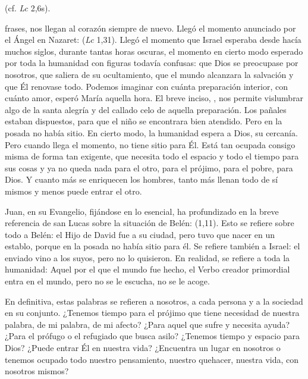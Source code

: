 
\begin{body}	
	 (cf. \emph{Lc} 2,6s). 
	
	 frases, nos llegan al corazón siempre de nuevo. Llegó el momento anunciado por el Ángel en Nazaret:  (\emph{Lc} 1,31). Llegó el momento que Israel esperaba desde hacía muchos siglos, durante tantas horas oscuras, el momento en cierto modo esperado por toda la humanidad con figuras todavía confusas: que Dios se preocupase por nosotros, que saliera de su ocultamiento, que el mundo alcanzara la salvación y que Él renovase todo. Podemos imaginar con cuánta preparación interior, con cuánto amor, esperó María aquella hora. El breve inciso, , nos permite vislumbrar algo de la santa alegría y del callado celo de aquella preparación. Los pañales estaban dispuestos, para que el niño se encontrara bien atendido. Pero en la posada no había sitio. En cierto modo, la humanidad espera a Dios, su cercanía. Pero cuando llega el momento, no tiene sitio para Él. Está tan ocupada consigo misma de forma tan exigente, que necesita todo el espacio y todo el tiempo para sus cosas y ya no queda nada para el otro, para el prójimo, para el pobre, para Dios. Y cuanto más se enriquecen los hombres, tanto más llenan todo de sí mismos y menos puede entrar el otro.
	
	Juan, en su Evangelio, fijándose en lo esencial, ha profundizado en la breve referencia de san Lucas sobre la situación de Belén:  (1,11). Esto se refiere sobre todo a Belén: el Hijo de David fue a su ciudad, pero tuvo que nacer en un establo, porque en la posada no había sitio para él. Se refiere también a Israel: el enviado vino a los suyos, pero no lo quisieron. En realidad, se refiere a toda la humanidad: Aquel por el que el mundo fue hecho, el Verbo creador primordial entra en el mundo, pero no se le escucha, no se le acoge.
	
	En definitiva, estas palabras se refieren a nosotros, a cada persona y a la sociedad en su conjunto. ¿Tenemos tiempo para el prójimo que tiene necesidad de nuestra palabra, de mi palabra, de mi afecto? ¿Para aquel que sufre y necesita ayuda? ¿Para el prófugo o el refugiado que busca asilo? ¿Tenemos tiempo y espacio para Dios? ¿Puede entrar Él en nuestra vida? ¿Encuentra un lugar en nosotros o tenemos ocupado todo nuestro pensamiento, nuestro quehacer, nuestra vida, con nosotros mismos?
	

\end{body}
